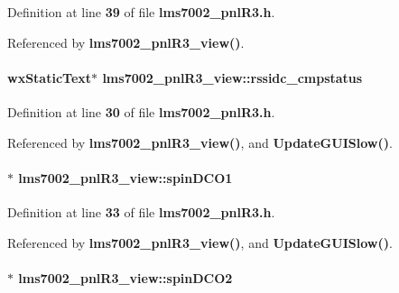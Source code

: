 Definition at line {\bf 39} of file {\bf lms7002\+\_\+pnl\+R3.\+h}.



Referenced by {\bf lms7002\+\_\+pnl\+R3\+\_\+view()}.

\paragraph[{rssidc\+\_\+cmpstatus}]{\setlength{\rightskip}{0pt plus 5cm}wx\+Static\+Text$\ast$ lms7002\+\_\+pnl\+R3\+\_\+view\+::rssidc\+\_\+cmpstatus\hspace{0.3cm}{\ttfamily [protected]}}\label{classlms7002__pnlR3__view_ab6e477279008a097ccd0c60ce2d0372d}


Definition at line {\bf 30} of file {\bf lms7002\+\_\+pnl\+R3.\+h}.



Referenced by {\bf lms7002\+\_\+pnl\+R3\+\_\+view()}, and {\bf Update\+G\+U\+I\+Slow()}.

\paragraph[{spin\+D\+C\+O1}]{$\ast$ lms7002\+\_\+pnl\+R3\+\_\+view\+::spin\+D\+C\+O1\hspace{0.3cm}{\ttfamily [protected]}}\label{classlms7002__pnlR3__view_a5cd7e844ebc8bfab502d70b5b2bd3268}


Definition at line {\bf 33} of file {\bf lms7002\+\_\+pnl\+R3.\+h}.



Referenced by {\bf lms7002\+\_\+pnl\+R3\+\_\+view()}, and {\bf Update\+G\+U\+I\+Slow()}.

\paragraph[{spin\+D\+C\+O2}]{$\ast$ lms7002\+\_\+pnl\+R3\+\_\+view\+::spin\+D\+C\+O2\hspace{0.3cm}{\ttfamily [protected]}}\label{classlms7002__pnlR3__view_a0efc1d6cdb9ad466788dfffccab31796}


